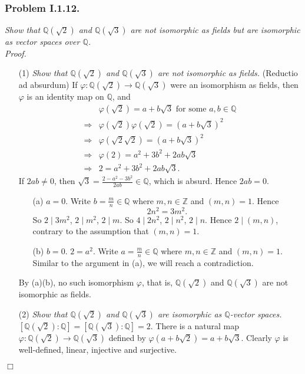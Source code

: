 \documentclass{article}
\begin{document}



\subsubsection*{Problem I.1.12.}
\emph{Show that $\mathbb{Q}(\sqrt{2})$ and $\mathbb{Q}(\sqrt{3})$
are not isomorphic as fields but are isomorphic as vector spaces over $\mathbb{Q}$.} \\

\emph{Proof.}
\begin{enumerate}
\item[(1)]
\emph{Show that $\mathbb{Q}(\sqrt{2})$ and $\mathbb{Q}(\sqrt{3})$
are not isomorphic as fields.}
(Reductio ad absurdum)
If $\varphi: \mathbb{Q}(\sqrt{2}) \to \mathbb{Q}(\sqrt{3})$ were an isomorphism
as fields, then $\varphi$ is an identity map on $\mathbb{Q}$, and
\begin{align*}
&\varphi(\sqrt{2}) = a + b\sqrt{3} \text{ for some } a, b \in \mathbb{Q} \\
\Longrightarrow&
\varphi(\sqrt{2})\varphi(\sqrt{2}) = (a + b\sqrt{3})^2 \\
\Longrightarrow&
\varphi(\sqrt{2} \sqrt{2}) = (a + b\sqrt{3})^2 \\
\Longrightarrow&
\varphi(2) = a^2 + 3b^2 + 2ab\sqrt{3} \\
\Longrightarrow&
2 = a^2 + 3b^2 + 2ab\sqrt{3}.
\end{align*}
If $2ab \neq 0$, then $\sqrt{3} = \frac{2-a^2-3b^2}{2ab} \in \mathbb{Q}$,
which is absurd.
Hence $2ab = 0$.
  \begin{enumerate}
  \item[(a)]
  $a = 0$.
  Write $b = \frac{m}{n} \in \mathbb{Q}$ where $m, n \in \mathbb{Z}$ and $(m, n) = 1$.
  Hence
  $$2n^2 = 3m^2.$$
  So $2 \mid 3m^2$, $2 \mid m^2$, $2 \mid m$. So $4 \mid 2n^2$, $2 \mid n^2$, $2 \mid n$.
  Hence $2 \mid (m,n)$, contrary to the assumption that $(m,n) = 1$.
  \item[(b)]
  $b = 0$.
  $2 = a^2$.
  Write $a = \frac{m}{n} \in \mathbb{Q}$ where $m, n \in \mathbb{Z}$ and $(m, n) = 1$.
  Similar to the argument in (a), we will reach a contradiction.
  \end{enumerate}
By (a)(b), no such isomorphism $\varphi$, that is,
$\mathbb{Q}(\sqrt{2})$ and $\mathbb{Q}(\sqrt{3})$
are not isomorphic as fields.
\item[(2)]
\emph{Show that $\mathbb{Q}(\sqrt{2})$ and $\mathbb{Q}(\sqrt{3})$
are isomorphic as $\mathbb{Q}$-vector spaces.}
$[\mathbb{Q}(\sqrt{2}):\mathbb{Q}] = [\mathbb{Q}(\sqrt{3}):\mathbb{Q}] = 2$.
There is a natural map $\varphi: \mathbb{Q}(\sqrt{2}) \to \mathbb{Q}(\sqrt{3})$
defined by $\varphi(a + b\sqrt{2}) = a + b\sqrt{3}$.
Clearly $\varphi$ is well-defined, linear, injective and surjective.
\end{enumerate}
$\Box$ \\\\
\end{document}
